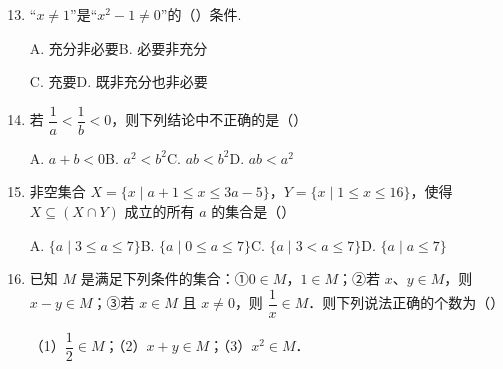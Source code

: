 \documentclass[a4paper,11pt]{article}
\begin{document}
\begin{enumerate}
\setcounter{enumi}{12}

\item “$x\neq1$”是“$x^2-1\neq0$”的\mbox{（\quad）}条件.

\keepwithprev
A. 充分非必要\qquad B. 必要非充分

C. 充要\qquad D. 既非充分也非必要

\ifanswer
\solbegin
{}
\solend
\fi

\item 若 $\dfrac1a<\dfrac1b<0$，则下列结论中不正确的是\mbox{（\quad）}

\keepwithprev
A. $a+b<0$\qquad B. $a^2<b^2$\qquad C. $ab<b^2$\qquad D. $ab<a^2$

\ifanswer
\solbegin
{}
\solend
\fi

\item 非空集合 $X=\{x\mid a+1\leqslant x\leqslant3a-5\}$，$Y=\{x\mid1\leqslant x\leqslant16\}$，使得 $X\subseteq(X\cap Y)$ 成立的所有 $a$ 的集合是\mbox{（\quad）}

\keepwithprev
A. $\{a\mid3\leqslant a\leqslant7\}$\qquad B. $\{a\mid0\leqslant a\leqslant7\}$\qquad C. $\{a\mid3<a\leqslant7\}$\qquad D. $\{a\mid a\leqslant7\}$

\ifanswer
\solbegin
{}
\solend
\fi

\item 已知 $M$ 是满足下列条件的集合：①$0\in M$，$1\in M$；②若 $x$、$y\in M$，则 $x-y\in M$；③若 $x\in M$ 且 $x\neq0$，则 $\dfrac1x\in M$．则下列说法正确的个数为\mbox{（\quad）}

（1）$\dfrac12\in M$；（2）$x+y\in M$；（3）$x^2\in M$．


\end{enumerate}
\end{document}
